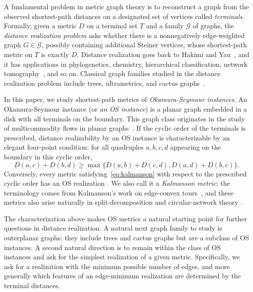 \documentclass[11pt]{article}
\begin{document}
A fundamental problem in metric graph theory is to reconstruct a graph
from the observed shortest-path distances on a designated set of vertices called \emph{terminals}.  Formally, given a
metric $D$ on a terminal set $T$ and a family $\mathcal G$ of graphs, the
\emph{distance realization problem} asks whether there is a nonnegatively
edge-weighted graph $G\in\mathcal G$, possibly containing additional Steiner
vertices, whose shortest-path metric on $T$ is exactly $D$.  Distance
realization goes back to Hakimi and Yau~\cite{HakimiYau65}, and it has applications in 
phylogenetics, chemistry, hierarchical classification, network
tomography~\cite{dress2012basic,janezic2015graph,gordon1987review,chung2001distance}, and so on.
Classical graph families studied in the distance realization problem include trees, ultrametrics, and cactus graphs~\cite{pereira1969note,buneman1974note,dress1984trees,gordon1987review,hayamizu2020recognizing}.

In this paper, we study shortest-path metrics of \emph{Okamura-Seymour instances}.
An Okamura-Seymour instance (or \emph{an OS instance}) is a planar graph embedded
in a disk with all terminals on the boundary.  This graph class originates in
the study of multicommodity flows in planar graphs~\cite{okamura1981multicommodity}.
If the cyclic order of the terminals is prescribed, distance realizability by an OS
instance is characterizable by an elegant four-point condition: for all quadruples
$a,b,c,d$ appearing on the boundary in this cyclic order,
\begin{equation}\label{eq:kalmanson}
  D(a,c)+D(b,d)
  \ge
  \max\bigl\{
    D(a,b)+D(c,d),
    D(a,d)+D(b,c)
  \bigr\}.
\end{equation}
Conversely, every metric satisfying~\eqref{eq:kalmanson} with respect to the prescribed
cyclic order has an OS realization
\cite{hurkens1988tidy,ChangO20,schrijver2003combinatorial}.  
We also call it a \emph{Kalmanson metric}; the terminology comes from
Kalmanson's work on edge-convex tours~\cite{kalmanson1975}, and these metrics
also arise naturally in split-decomposition and circular-network theory
\cite{bandelt1992,forcey2023}.

The characterization above makes OS metrics a natural starting point for
further questions in distance realization. A natural next graph
family to study is outerplanar graphs: they include trees
and cactus graphs but are a subclass of OS instances.
%
A second natural direction is to remain within the class of OS instances
and ask for the simplest realization of a given metric. Specifically, we ask for a realization
with the minimum possible number of edges, and more generally which features
of an edge-minimum realization are determined by the terminal distances. %
\end{document}
